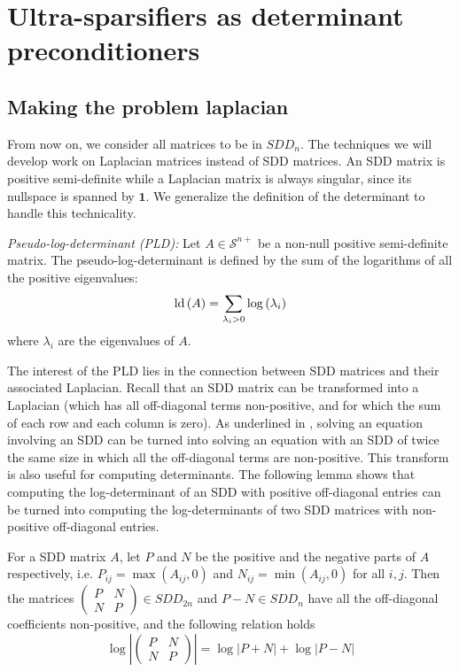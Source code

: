 
\section{Ultra-sparsifiers as determinant preconditioners}


\subsection{Making the problem laplacian}

\label{sec:Making-the-problem}

From now on, we consider all matrices to be in $SDD_{n}$. The techniques
we will develop work on Laplacian matrices instead of SDD matrices.
An SDD matrix is positive semi-definite while a Laplacian matrix is
always singular, since its nullspace is spanned by $\mathbf{1}$.
We generalize the definition of the determinant to handle this technicality.

\begin{definition} \emph{Pseudo-log-determinant (PLD):} Let $A\in\mathcal{S}^{n+}$
be a non-null positive semi-definite matrix. The pseudo-log-determinant
is defined by the sum of the logarithms of all the positive eigenvalues:
\[
\text{\textnormal{ld}}\left(A\right)=\sum_{\lambda_{i}>0}\log\left(\lambda_{i}\right)
\]
where $\lambda_{i}$ are the eigenvalues of $A$. \end{definition}

The interest of the PLD lies in the connection between SDD matrices
and their associated Laplacian. Recall that an SDD matrix can be transformed
into a Laplacian (which has all off-diagonal terms non-positive, and
for which the sum of each row and each column is zero). As underlined
in \cite{Gremban1996}, solving an equation involving an SDD can be
turned into solving an equation with an SDD of twice the same size
in which all the off-diagonal terms are non-positive. This transform
is also useful for computing determinants. The following lemma shows
that computing the log-determinant of an SDD with positive off-diagonal
entries can be turned into computing the log-determinants of two SDD
matrices with non-positive off-diagonal entries.

\begin{lemma}\label{non-negative-conversion} For a SDD matrix $A$,
let $P$ and $N$ be the positive and the negative parts of $A$ respectively,
i.e. $P_{ij}=\max(A_{ij},0)$ and $N_{ij}=\min(A_{ij},0)$ for all
$i,j$. Then the matrices $\left(\begin{array}{cc}
P & N\\
N & P
\end{array}\right)\in SDD_{2n}$ and $P-N\in SDD_{n}$ have all the off-diagonal coefficients non-positive,
and the following relation holds 
\[
\log\left|\left(\begin{array}{cc}
P & N\\
N & P
\end{array}\right)\right|=\log\left|P+N\right|+\log\left|P-N\right|
\]
\end{lemma}

